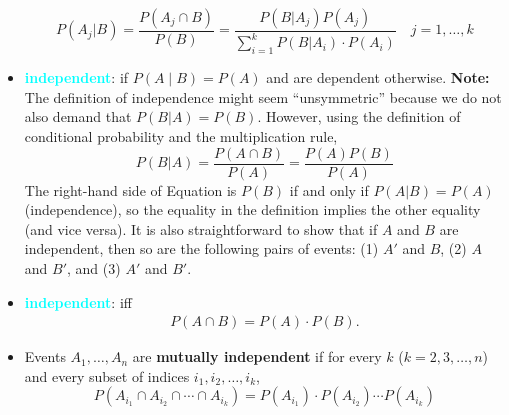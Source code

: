 \documentclass{report}
\begin{document}
\begin{itemize}
            \[
                P(A_j|B) = \frac{P(A_j \cap B)}{P(B)} = \frac{P(B|A_j)P(A_j)}{\sum_{i=1}^{k} P(B|A_i) \cdot P(A_i)} \quad j = 1, \ldots, k
            \]
        \item \textbf{\textcolor{cyan}{independent}}: if $P(A\mid B)  = P(A)$ and are dependent otherwise.
            \bigbreak \noindent 
            \textbf{Note:} The definition of independence might seem “unsymmetric” because we do not also demand that \( P(B|A) = P(B) \). However, using the definition of conditional probability and the multiplication rule,
            \[
                P(B|A) = \frac{P(A \cap B)}{P(A)} = \frac{P(A)P(B)}{P(A)}
            \]
            The right-hand side of Equation is \( P(B) \) if and only if \( P(A|B) = P(A) \) (independence), so the equality in the definition implies the other equality (and vice versa). It is also straightforward to show that if \( A \) and \( B \) are independent, then so are the following pairs of events: (1) \( A' \) and \( B \), (2) \( A \) and \( B' \), and (3) \( A' \) and \( B' \).
        \item \textbf{\textcolor{cyan}{independent}}: iff
            \begin{align*}
                P(A \cap B) = P(A) \cdot P(B)
            .\end{align*}
        \item 
            Events \( A_1, \ldots, A_n \) are \textbf{mutually independent} if for every \( k \) (\( k = 2, 3, \ldots, n \)) and every subset of indices \( i_1, i_2, \ldots, i_k \),
            \[
                P(A_{i_1} \cap A_{i_2} \cap \cdots \cap A_{i_k}) = P(A_{i_1}) \cdot P(A_{i_2}) \cdots P(A_{i_k})
            \]
    \end{itemize}

    \pagebreak \bigbreak \noindent   
\end{document}
